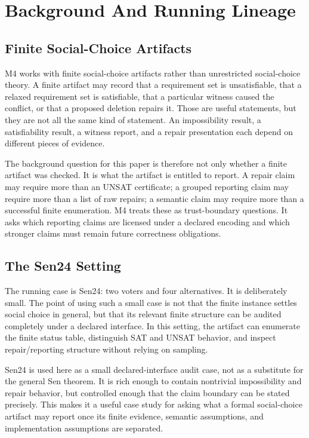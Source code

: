 \section{Background And Running Lineage}

\subsection{Finite Social-Choice Artifacts}

M4 works with finite social-choice artifacts rather than unrestricted
social-choice theory. A finite artifact may record that a requirement set is
unsatisfiable, that a relaxed requirement set is satisfiable, that a particular
witness caused the conflict, or that a proposed deletion repairs it. Those are
useful statements, but they are not all the same kind of statement. An
impossibility result, a satisfiability result, a witness report, and a repair
presentation each depend on different pieces of evidence.

The background question for this paper is therefore not only whether a finite
artifact was checked. It is what the artifact is entitled to report. A repair
claim may require more than an UNSAT certificate; a grouped reporting claim may
require more than a list of raw repairs; a semantic claim may require more than
a successful finite enumeration. M4 treats these as trust-boundary questions.
It asks which reporting claims are licensed under a declared encoding and
which stronger claims must remain future correctness obligations.

\subsection{The Sen24 Setting}

The running case is Sen24: two voters and four alternatives. It is deliberately
small. The point of using such a small case is not that the finite instance
settles social choice in general, but that its relevant finite structure can
be audited completely under a declared interface. In this setting, the
artifact can enumerate the finite status table, distinguish SAT and UNSAT
behavior, and inspect repair/reporting structure without relying on sampling.

Sen24 is used here as a small declared-interface audit case, not as a
substitute for the general Sen theorem. It is rich enough to contain
nontrivial impossibility and repair behavior, but controlled enough that the
claim boundary can be stated precisely. This makes it a useful case study for
asking what a formal social-choice artifact may report once its finite
evidence, semantic assumptions, and implementation assumptions are separated.

